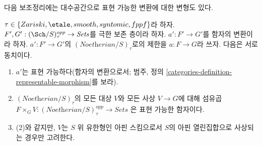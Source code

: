 \noindent
다음 보조정리에는 대수공간으로 표현 가능한 변환에 대한 변형도 있다.

\begin{lemma}
\label{lemma-representable}
$\tau \in \{Zariski, \etale, smooth, syntomic, fppf\}$라 하자.
$F', G' : (\Sch/S)_\tau^{opp} \to \textit{Sets}$를 극한 보존 층이라 하자.
$a' : F' \to G'$를 함자의 변환이라 하자.
$a' : F' \to G'$의 $(\textit{Noetherian}/S)_\tau$로의 제한을
$a : F \to G$라 쓰자. 다음은 서로 동치이다.
\begin{enumerate}
\item $a'$는 표현 가능하다(함자의 변환으로서; 범주, 정의
\ref{categories-definition-representable-morphism}를 보라).
\item $(\textit{Noetherian}/S)_\tau$의 모든 대상 $V$와 모든 사상
$V \to G$에 대해 섬유곱
$F \times_G V : (\textit{Noetherian}/S)_\tau^{opp} \to \textit{Sets}$
은 표현 가능한 함자이다.
\item (2)와 같지만, $V$는 $S$ 위 유한형인 아핀 스킴으로서
$S$의 아핀 열린집합으로 사상되는 경우만 고려한다.
\end{enumerate}
\end{lemma}

